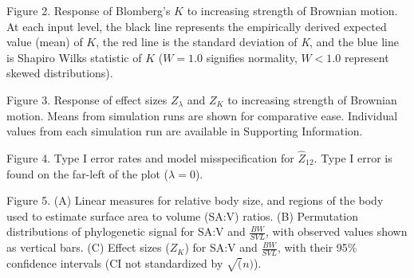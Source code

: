 \documentclass[
]{article}
\begin{document}
Figure 2. Response of Blomberg's \(K\) to increasing strength of
Brownian motion. At each input level, the black line represents the
empirically derived expected value (mean) of \(K\), the red line is the
standard deviation of \emph{K}, and the blue line is Shapiro Wilks
statistic of \(K\) (\(W=1.0\) signifies normality, \(W< 1.0\) represent
skewed distributions). \hfill\break

Figure 3. Response of effect sizes \(Z_\lambda\) and \(Z_K\) to
increasing strength of Brownian motion. Means from simulation runs are
shown for comparative ease. Individual values from each simulation run
are available in Supporting Information. \hfill\break

Figure 4. Type I error rates and model misspecification for
\(\hat{Z}_{12}\). Type I error is found on the far-left of the plot
(\(\lambda = 0\)).

Figure 5. (A) Linear measures for relative body size, and regions of the
body used to estimate surface area to volume (SA:V) ratios. (B)
Permutation distributions of phylogenetic signal for SA:V and
\(\frac{BW}{SVL}\), with observed values shown as vertical bars. (C)
Effect sizes (\(Z_K\)) for SA:V and \(\frac{BW}{SVL}\), with their 95\%
confidence intervals (CI not standardized by \(\sqrt(n)\)). \hfill\break

\newpage
\end{document}
